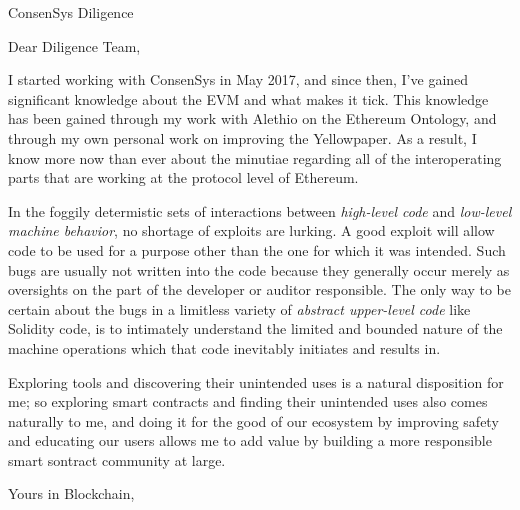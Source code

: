 \documentclass[
	pagenumber=false, %
	parskip=half, %
	fromalign=right, %
	foldmarks=true, %
	addrfield=false ]{scrlttr2}
\date{\today} %
\begin{document}
 
\begin{letter}{ConsenSys Diligence} %


\opening{Dear Diligence Team,}

	I started working with ConsenSys in May 2017, and since then, I've gained significant knowledge about the EVM and what makes it tick. This knowledge has been gained through my work with Alethio on the Ethereum Ontology, and through my own personal work on improving the Yellowpaper. As a result, I know more now than ever about the minutiae regarding all of the interoperating parts that are working at the protocol level of Ethereum. 

	In the foggily determistic sets of interactions between \textit{high-level code} and \textit{low-level machine behavior}, no shortage of exploits are lurking. A good exploit will allow code to be used for a purpose other than the one for which it was intended. Such bugs are usually not written into the code because they generally occur merely as oversights on the part of the developer or auditor responsible. The only way to be certain about the bugs in a limitless variety of \textsl{abstract upper-level code} like Solidity code, is to intimately understand the limited and bounded nature of the machine operations which that code inevitably initiates and results in. 
	
	 Exploring tools and discovering their unintended uses is a natural disposition for me; so exploring smart contracts and finding their unintended uses also comes naturally to me, and doing it for the good of our ecosystem by improving safety and educating our users allows me to add value by building a more responsible smart sontract community at large. 

\closing{Yours in Blockchain,}



\end{letter}
 
\end{document}
